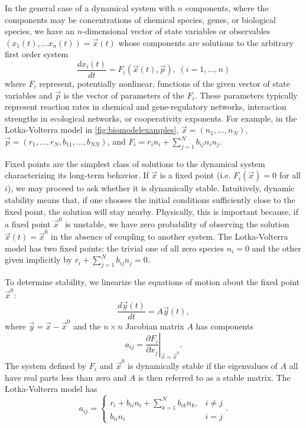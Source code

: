 
In the general case of a dynamical system with $n$ components, where the components may be concentrations of chemical species, genes, or biological species, we have an $n$-dimensional vector of state variables or observables $(x_1(t), \ldots x_n(t)) = \vec{x}(t)
$
whose components are solutions to the arbitrary first order system
$$
\frac{dx_i(t)}{dt} = F_i(\vec{x}(t), \vec{p}), \; (i=1,\ldots,n)
$$
where $F_i$ represent, potentially nonlinear, functions of the given vector of state variables and $\vec{p}$ is the vector of parameters of the $F_i$. These parameters typically represent reaction rates in chemical and gene-regulatory networks, interaction strengths in ecological networks, or cooperativity exponents. For example, in the Lotka-Volterra model in \ref{fig:biomodelexamples}, $\vec{x} = (n_1, \ldots, n_N)$, $\vec{p}=(r_1,\ldots,r_N,b_{11},\ldots,b_{NN})$, and $F_i = r_i n_i + \sum_{j=1}^{N} b_{ij} n_i n_j$.

Fixed points are the simplest class of solutions to the dynamical system characterizing its long-term behavior. If $\vec x$ is a fixed point (i.e. $F_i(\vec{x})=0$ for all $i$), we
may proceed to ask whether it is dynamically stable.
Intuitively, dynamic stability means that, if one chooses the initial
conditions sufficiently close to the fixed point, the solution will
stay nearby.  Physically, this is important because,
if a fixed point ${\vec x}^0$ is unstable, we have zero probability of
observing the solution ${\vec x}(t) = {\vec x}^0$ in the absence of coupling to another system. The Lotka-Volterra model has two fixed points: the trivial one of all zero species $n_i=0$ and the other given implicitly by $r_i + \sum_{j=1}^{N} b_{ij} n_j = 0$.

To determine stability, we linearize the equations of motion about the
fixed point $\vec{x}^0$:
\begin{equation}\label{eq:lineardynsys}
\frac{d\vec{y}(t)}{dt} = A \vec{y}(t),
\end{equation}
where $\vec{y} = \vec{x} - \vec{x}^0$ and the $n \times n$ Jacobian matrix $A$ has components
$$
a_{ij} = \left. \frac{\partial F_i}{\partial x_j} \right|_{\vec{x} = \vec{x}^0}.
$$
The system defined by $F_i$ and $\vec{x}^0$ is dynamically stable if the eigenvalues of $A$ all have real parts less than zero and $A$ is then referred to as a stable matrix. The Lotka-Volterra model has
 \begin{equation}\label{eq:lotkavolterrajacobian}
   a_{ij} = \left\{
     \begin{array}{lr}
       r_i + b_{ii} n_i + \sum_{k=1}^{N} b_{ik} n_{k}, & i \neq j\\
       b_{ii} n_i & i=j
     \end{array}.
   \right.
\end{equation}

